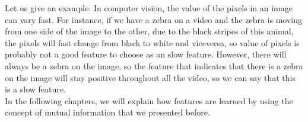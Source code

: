 Let us give an example: In computer vision, the value of the pixels in an image can vary fast. For instance, if we have a zebra on a video and the zebra is moving from one side of the image to the other, due 
to the black stripes of this animal, the pixels will fast change from black to white and viceversa, so value of pixels is probably not a good feature to choose as an slow feature. However, there will always
be a zebra on the image, so the feature that indicates that there is a zebra on the image will stay positive throughout all the video, so we can say that this is a slow feature.\\

In the following chapters, we will explain how features are learned by using the concept of mutual information that we presented before. 


